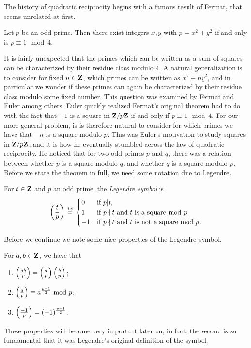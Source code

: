 \documentclass[11pt]{amsart}
\begin{document}
The history of quadratic reciprocity begins with a famous result of Fermat, that seems unrelated at first.
\begin{theorem}[Fermat]
  Let $p$ be an odd prime. Then there exist integers $x,y$ with $p=x^2+y^2$ if and only is $p\equiv 1 \mod 4$.
\end{theorem}
It is fairly unexpected that the primes which can be written as a sum of squares can be characterized by their residue class modulo $4$.
A natural generalization is to consider for fixed $n\in \bf Z$, which primes can be written as $x^2+ny^2$, and in particular we wonder if these primes can again be characterized by their residue class modulo some fixed number.
This question was examined by Fermat and Euler among others. Euler quickly realized Fermat's original theorem had to do with the fact that $-1$ is a square in $\bf Z/p\bf Z$ if and only if $p\equiv 1\mod 4$. For our more general problem, is is therefore natural to consider for which primes we have that $-n$ is a square modulo $p$. This was Euler's motivation to study squares in $\bf Z/p\bf Z$, and it is how he eventually stumbled across the law of quadratic reciprocity. He noticed that for two odd primes $p$ and $q$, there was a relation between whether $p$ is a square modulo $q$, and whether $q$ is a square modulo $p$. Before we state the theorem in full, we need some notation due to Legendre.
\begin{defi}
For $t\in \bf Z$ and $p$ an odd prime, the \emph{Legendre symbol} is
\[\leg tp \deff  \begin{cases} 0 &\text{if } p|t, \\ 1 &\text{if } p\nmid t \text{ and } t \text{ is a square mod } p, \\ -1 &\text{if } p\nmid t \text{ and } t \text{ is not a square mod } p. \end{cases}\]
\end{defi}
Before we continue we note some nice properties of the Legendre symbol.

\begin{prop}
\label{prop:leg}
For $a,b \in \bf Z$, we have that
\begin{enumerate}
\item $\leg{ab}{p} = \leg ap \leg bp$;
\item $\leg ap \equiv a^{\frac{p-1}{2}} \mod p$;
\item $\leg {-1}{p} = (-1)^{\frac{p-1}{2}}$.
\end{enumerate}
\end{prop}
These properties will become very important later on; in fact, the second is so fundamental that it was Legendre's original definition of the symbol.
\end{document}
